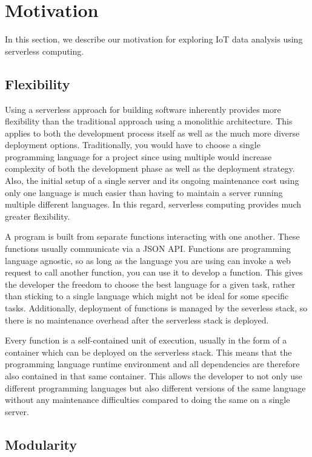 \section{Motivation}

In this section, we describe our motivation for exploring IoT data analysis using serverless
computing.


\subsection{Flexibility}

Using a serverless approach for building software inherently provides more flexibility than the
traditional approach using a monolithic architecture. This applies to both the development process
itself as well as the much more diverse deployment options. Traditionally, you would have to choose
a single programming language for a project since using multiple would increase complexity of both
the development phase as well as the deployment strategy. Also, the initial setup of a single server
and its ongoing maintenance cost using only one language is much easier than having to maintain a
server running multiple different languages. In this regard, serverless computing provides much
greater flexibility.

A program is built from separate functions interacting with one another. These
functions usually communicate via a JSON API. Functions are programming language agnostic, so as
long as the language you are using can invoke a web request to call another function, you can use it
to develop a function. This gives the developer the freedom to choose the best language for a given
task, rather than sticking to a single language which might not be ideal for some specific tasks.
Additionally, deployment of functions is managed by the severless stack, so there is no maintenance
overhead after the serverless stack is deployed.

Every function is a self-contained unit of
execution, usually in the form of a container which can be deployed on the serverless stack. This
means that the programming language runtime environment and all dependencies are therefore also
contained in that same container. This allows the developer to not only use different programming
languages but also different versions of the same language without any maintenance difficulties
compared to doing the same on a single server.

\subsection{Modularity}

